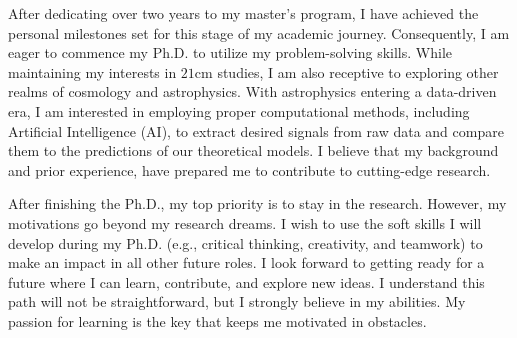 \documentclass{article}
\begin{document}
After dedicating over two years to my master's program, I have achieved the personal milestones set for this stage of my academic journey. Consequently, I am eager to commence my Ph.D. to utilize my problem-solving skills. While maintaining my interests in $\mathrm{21cm}$ studies, I am also receptive to exploring other realms of cosmology and astrophysics. With astrophysics entering a data-driven era, I am interested in employing proper computational methods, including Artificial Intelligence (AI), to extract desired signals from raw data and compare them to the predictions of our theoretical models. I believe that my background and prior experience, have prepared me to contribute to cutting-edge research.\par

After finishing the Ph.D., my top priority is to stay in the research. However, my motivations go beyond my research dreams. I wish to use the soft skills I will develop during my Ph.D. (e.g., critical thinking, creativity, and teamwork) to make an impact in all other future roles. I look forward to getting ready for a future where I can learn, contribute, and explore new ideas. I understand this path will not be straightforward, but I strongly believe in my abilities. My passion for learning is the key that keeps me motivated in obstacles.\par

\end{document}
